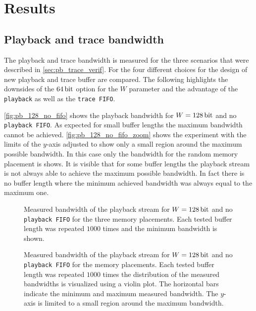 \section{Results}\label{sec:results}
\subsection{Playback and trace bandwidth}\label{sec:pb_trace_bw}
The playback and trace bandwidth is measured for the three scenarios that were described in \autoref{sec:pb_trace_verif}. For the four different choices for the design of new playback and trace buffer are compared. The following highlights the downsides of the $\PhyWordSize{}$ option for the $W$ parameter and the advantage of the \texttt{playback} as well as the \texttt{trace FIFO}.

\autoref{fig:pb_128_no_fifo} shows the playback bandwidth for $W = \SI{128}{\bit}$ and no \texttt{playback FIFO}. As expected for small buffer lengths the maximum bandwidth cannot be achieved. \autoref{fig:pb_128_no_fifo_zoom} shows the experiment with the limits of the \(y\)-axis adjusted to show only a small region around the maximum possible bandwidth. In this case only the bandwidth for the random memory placement is shows. It is visible that for some buffer lengths the playback stream is not always able to achieve the maximum possible bandwidth. In fact there is no buffer length where the minimum achieved bandwidth was always equal to the maximum one.
\begin{figure}[H]
\caption{Measured bandwidth of the playback stream for $W = \SI{128}{\bit}$ and no \texttt{playback FIFO} for the three memory placements. Each tested buffer length was repeated $\num{1000}$ times and the minimum bandwidth is shown.}\label{fig:pb_128_no_fifo}
\end{figure}

\begin{figure}[H]
\caption{Measured bandwidth of the playback stream for $W = \SI{128}{\bit}$ and no \texttt{playback FIFO} for the \random{} memory placements. Each tested buffer length was repeated $\num{1000}$ times the distribution of the measured bandwidths is visualized using a violin plot. The horizontal bars indicate the minimum and maximum measured bandwidth. The \(y\)-axis is limited to a small region around the maximum bandwidth.}\label{fig:pb_128_no_fifo_zoom}
\end{figure}

